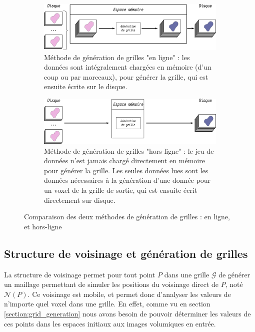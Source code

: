 {{{            \begin{figure}[h]
                \centering
                \begin{subfigure}{.8\linewidth}
                    \centering
                    \includegraphics[width=\linewidth]{img/grid_gen_method_online.png}
                    \captionsetup{width=\linewidth}
                    \caption{Méthode de génération de grilles "en ligne" : les données sont intégralement chargées en mémoire (d'un coup ou par morceaux), pour générer la grille, qui est ensuite écrite sur le disque.}
                    \label{img:grid_gen:online}
                \end{subfigure}
                \begin{subfigure}{.8\linewidth}
                    \centering
                    \includegraphics[width=\linewidth]{img/grid_gen_method_offline.png}
                    \captionsetup{width=\linewidth}
                    \caption{Méthode de génération de grilles "hors-ligne" : le jeu de données n'est jamais chargé directement en mémoire pour générer la grille. Les seules données lues sont les données nécessaires à la génération d'une donnée pour un voxel de la grille de sortie, qui est ensuite écrit directement sur disque.}
                    \label{img:grid_gen:offline}
                \end{subfigure}
                \captionsetup{width=.8\linewidth}
                \caption{Comparaison des deux méthodes de génération de grilles : en ligne, et hors-ligne}
                \label{img:grid_gen}
            \end{figure}
        }

        \subsection{Structure de voisinage et génération de grilles}
        {
            La structure de voisinage permet pour tout point $P$ dans une grille $\mathcal{G}$ de générer un maillage permettant de simuler les positions du voisinage direct de $P$, noté $\mathcal{N}(P)$. Ce voisinage est mobile, et permet donc d'analyser les valeurs de n'importe quel voxel dans une grille. En effet, comme vu en section \ref{section:grid_generation} nous avons besoin de pouvoir déterminer les valeurs de ces points dans les espaces initiaux aux images volumiques en entrée.

}}}
